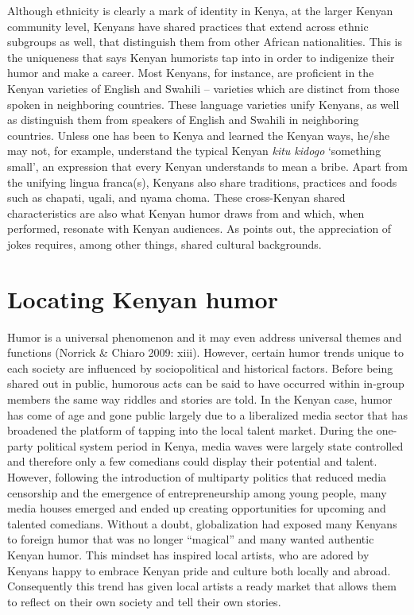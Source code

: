 \documentclass[output=paper]{langsci/langscibook}
\begin{document}
  Although ethnicity is clearly a mark of identity in Kenya, at the larger Kenyan community level, Kenyans have shared practices that extend across ethnic subgroups as well, that distinguish them from other African nationalities. This is the uniqueness that \citet[5]{Tumusiime2013} says Kenyan humorists tap into in order to indigenize their humor and make a career. Most Kenyans, for instance, are proficient in the Kenyan varieties of English and Swahili – varieties which are distinct from those spoken in neighboring countries. These language varieties unify Kenyans, as well as distinguish them from speakers of English and Swahili in neighboring countries. Unless one has been to Kenya and learned the Kenyan ways, he/she may not, for example, understand the typical Kenyan \textit{kitu kidogo }‘something small’, an expression that every Kenyan understands to mean a bribe. Apart from the unifying lingua franca(s), Kenyans also share traditions, practices and foods such as chapati, ugali, and nyama choma. These cross-Kenyan shared characteristics are also what Kenyan humor draws from and which, when performed, resonate with Kenyan audiences. As \citet{Chiaro1992} points out, the appreciation of jokes requires, among other things, shared cultural backgrounds.


\section{Locating Kenyan humor }

   Humor is a universal phenomenon and it may even address universal themes and functions (Norrick \& Chiaro 2009: xiii). However, certain humor trends unique to each society are influenced by sociopolitical and historical factors. Before being shared out in public, humorous acts can be said to have occurred within in-group members the same way riddles and stories are told. In the Kenyan case, humor has come of age and gone public largely due to a liberalized media sector that has broadened the platform of tapping into the local talent market. During the one-party political system period in Kenya, media waves were largely state controlled and therefore only a few comedians could display their potential and talent. However, following the introduction of multiparty politics that reduced media censorship and the emergence of entrepreneurship among young people, many media houses emerged and ended up creating opportunities for upcoming and talented comedians. Without a doubt, globalization had exposed many Kenyans to foreign humor that was no longer “magical” and many wanted authentic Kenyan humor. This mindset has inspired local artists, who are adored by Kenyans happy to embrace Kenyan pride and culture both locally and abroad. Consequently this trend has given local artists a ready market that allows them to reflect on their own society and tell their own stories. 
\end{document}
